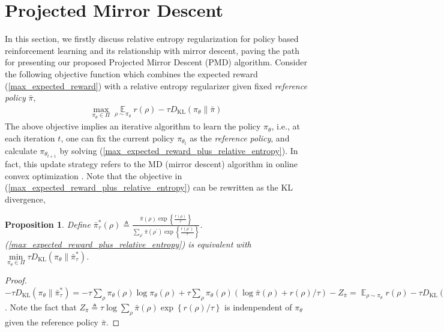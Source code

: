 \documentclass{article}
\DeclareMathOperator*\ep{\mathbb{E}}
\newcommand*{\refPi}{\bar{\pi}}
\newcommand{\KL}{D_{\text{KL}}}
\newcommand{\pithetat}{\pi_{\theta_t}}
\newtheorem{prop}{Proposition}
\begin{document}
\section{Projected Mirror Descent}
In this section, we firstly discuss relative entropy regularization for policy based reinforcement learning and its relationship with mirror descent, paving the path for presenting our proposed Projected Mirror Descent (PMD) algorithm. Consider the following objective function which combines the expected reward (\ref{max_expected_reward}) with a relative entropy regularizer given fixed \emph{reference policy} $\refPi$,
\begin{equation}
\label{max_expected_reward_plus_relative_entropy}
\begin{split}
	\max\limits_{\pi_\theta \in \Pi}{ \ep\limits_{\rho \sim \pi_\theta}{  r(\rho)  - \tau \KL(\pi_\theta \| \refPi) } }
\end{split}
\end{equation}
The above objective implies an iterative algorithm to learn the policy $\pi_\theta$, i.e., at each iteration $t$, one can fix the current policy $\pithetat$ as the \emph{reference policy}, and calculate $\pi_{\theta_{t+1}}$ by solving (\ref{max_expected_reward_plus_relative_entropy}). In fact, this update strategy refers to the MD (mirror descent) algorithm in online convex optimization \cite{}. Note that the objective in (\ref{max_expected_reward_plus_relative_entropy}) can be rewritten as the KL divergence,
\begin{prop}
Define $\bar{\pi}_\tau^*(\rho) \triangleq \frac{\refPi(\rho) \exp\left\{ \frac{r(\rho)}{\tau} \right\}}{ \sum_{\rho^{\prime}}{\refPi(\rho^{\prime}) \exp\left\{ \frac{r(\rho^{\prime})}{\tau} \right\} } }$. (\ref{max_expected_reward_plus_relative_entropy}) is equivalent with
$\min\limits_{\pi_\theta \in \Pi}{ \tau \KL(\pi_\theta \| \bar{\pi}_\tau^*) } $.
\label{prob1}
\end{prop}
\begin{proof}
$-\tau \KL(\pi_\theta \| \bar{\pi}_\tau^*) = - \tau \sum_{\rho}{ \pi_\theta(\rho) \log \pi_\theta(\rho) } + \tau \sum_{\rho}{ \pi_\theta(\rho) (\log \refPi(\rho) + r(\rho) / \tau ) }  - Z_{\refPi} = \ep_{\rho \sim \pi_\theta}{  r(\rho)  - \tau \KL(\pi_\theta \| \refPi) } - Z_{\refPi}$. Note the fact that $Z_{\refPi} \triangleq \tau \log{ \sum_{\rho}{\refPi(\rho) \exp\left\{ r(\rho) / \tau \right\} } }$ is indenpendent of $\pi_\theta$ given the reference policy $\refPi$.
\end{proof}
\end{document}
